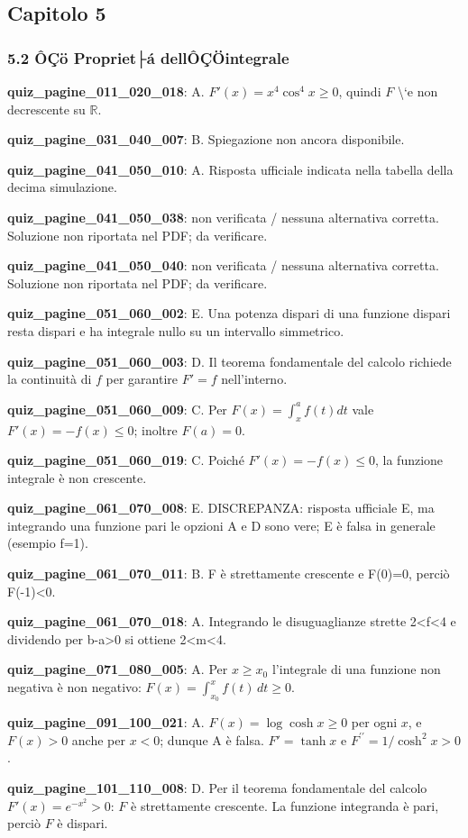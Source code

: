 \documentclass[11pt,a4paper]{article}
\newcounter{quiz}
\begin{document}
\subsection*{Capitolo 5}
\subsubsection*{5.2 ÔÇö Propriet├á dellÔÇÖintegrale}
\noindent\textbf{quiz\_pagine\_011\_020\_018}: A. $F\prime(x)=x^4\cos^4x\ge0$, quindi $F$ \textbackslash{}`e non decrescente su $\mathbb R$.\par\medskip
\noindent\textbf{quiz\_pagine\_031\_040\_007}: B. Spiegazione non ancora disponibile.\par\medskip
\noindent\textbf{quiz\_pagine\_041\_050\_010}: A. Risposta ufficiale indicata nella tabella della decima simulazione.\par\medskip
\noindent\textbf{quiz\_pagine\_041\_050\_038}: non verificata / nessuna alternativa corretta. Soluzione non riportata nel PDF; da verificare.\par\medskip
\noindent\textbf{quiz\_pagine\_041\_050\_040}: non verificata / nessuna alternativa corretta. Soluzione non riportata nel PDF; da verificare.\par\medskip
\noindent\textbf{quiz\_pagine\_051\_060\_002}: E. Una potenza dispari di una funzione dispari resta dispari e ha integrale nullo su un intervallo simmetrico.\par\medskip
\noindent\textbf{quiz\_pagine\_051\_060\_003}: D. Il teorema fondamentale del calcolo richiede la continuità di $f$ per garantire $F\prime=f$ nell’interno.\par\medskip
\noindent\textbf{quiz\_pagine\_051\_060\_009}: C. Per $F(x)=\int_x^a f(t)dt$ vale $F\prime(x)=-f(x)\le0$; inoltre $F(a)=0$.\par\medskip
\noindent\textbf{quiz\_pagine\_051\_060\_019}: C. Poiché $F\prime(x)=-f(x)\le0$, la funzione integrale è non crescente.\par\medskip
\noindent\textbf{quiz\_pagine\_061\_070\_008}: E. DISCREPANZA: risposta ufficiale E, ma integrando una funzione pari le opzioni A e D sono vere; E è falsa in generale (esempio f=1).\par\medskip
\noindent\textbf{quiz\_pagine\_061\_070\_011}: B. F è strettamente crescente e F(0)=0, perciò F(-1)<0.\par\medskip
\noindent\textbf{quiz\_pagine\_061\_070\_018}: A. Integrando le disuguaglianze strette 2<f<4 e dividendo per b-a>0 si ottiene 2<m<4.\par\medskip
\noindent\textbf{quiz\_pagine\_071\_080\_005}: A. Per $x\ge x_0$ l'integrale di una funzione non negativa è non negativo: $F(x)=\int_{x_0}^x f(t)\,dt\ge0$.\par\medskip
\noindent\textbf{quiz\_pagine\_091\_100\_021}: A. $F(x)=\log\cosh x\geq0$ per ogni $x$, e $F(x)>0$ anche per $x<0$; dunque A è falsa. $F\prime=\tanh x$ e $F^{\prime\prime}=1/\cosh^2x>0$.\par\medskip
\noindent\textbf{quiz\_pagine\_101\_110\_008}: D. Per il teorema fondamentale del calcolo $F\prime(x)=e^{-x^2}>0$: $F$ è strettamente crescente. La funzione integranda è pari, perciò $F$ è dispari.\par\medskip
\end{document}
